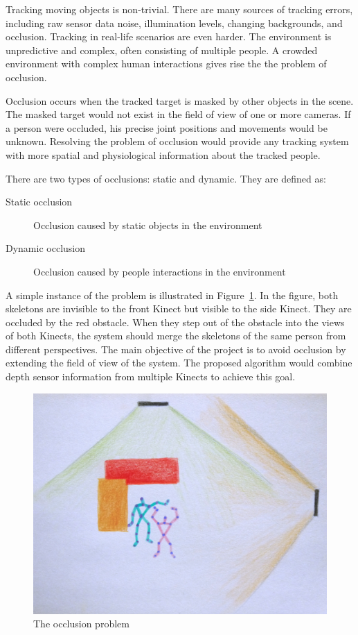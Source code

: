 Tracking moving objects is non-trivial. There are many sources of tracking errors, including raw sensor data noise, illumination levels, changing backgrounds, and occlusion. Tracking in real-life scenarios are even harder. The environment is unpredictive and complex, often consisting of multiple people. A crowded environment with complex human interactions gives rise the the problem of occlusion.

Occlusion occurs when the tracked target is masked by other objects in the scene. The masked target would not exist in the field of view of one or more cameras. If a person were occluded, his precise joint positions and movements would be unknown. Resolving the problem of occlusion would provide any tracking system with more spatial and physiological information about the tracked people.

There are two types of occlusions: static and dynamic. They are defined as:

\begin{description}
  \item[Static occlusion] Occlusion caused by static objects in the environment 
  \item[Dynamic occlusion] Occlusion caused by people interactions in the environment
\end{description}

A simple instance of the problem is illustrated in Figure~\ref{fig:occlusion_problem}. In the figure, both skeletons are invisible to the front Kinect but visible to the side Kinect. They are occluded by the red obstacle. When they step out of the obstacle into the views of both Kinects, the system should merge the skeletons of the same person from different perspectives. The main objective of the project is to avoid occlusion by extending the field of view of the system. The proposed algorithm would combine depth sensor information from multiple Kinects to achieve this goal.

\begin{figure}[!h]
  \centering
  \includegraphics[width=0.8\linewidth]{figs/occlusion_problem}
  \caption{The occlusion problem}
  \label{fig:occlusion_problem}
\end{figure}

